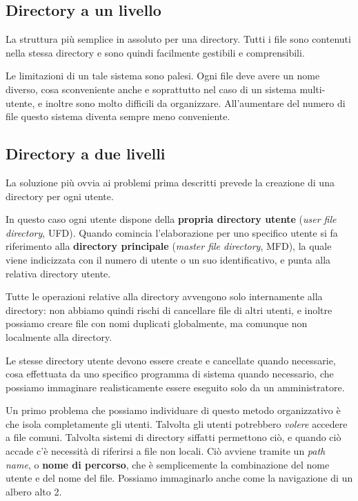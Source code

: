     \subsection{Directory a un livello}
        La struttura più semplice in assoluto per una directory. Tutti i file sono contenuti nella stessa directory e sono quindi facilmente gestibili e comprensibili.
        
        Le limitazioni di un tale sistema sono palesi. Ogni file deve avere un nome diverso, cosa sconveniente anche e soprattutto nel caso di un sistema multi-utente, e inoltre sono molto difficili da organizzare. All'aumentare del numero di file questo sistema diventa sempre meno conveniente.
        
    \subsection{Directory a due livelli}
        La soluzione più ovvia ai problemi prima descritti prevede la creazione di una directory per ogni utente.
        
        In questo caso ogni utente dispone della \textbf{propria directory utente} (\textit{user file directory}, UFD). Quando comincia l'elaborazione per uno specifico utente si fa riferimento alla \textbf{directory principale} (\textit{master file directory}, MFD), la quale viene indicizzata con il numero di utente o un suo identificativo, e punta alla relativa directory utente.
        
        Tutte le operazioni relative alla directory avvengono solo internamente alla directory: non abbiamo quindi rischi di cancellare file di altri utenti, e inoltre possiamo creare file con nomi duplicati globalmente, ma comunque non localmente alla directory.
        
        Le stesse directory utente devono essere create e cancellate quando necessarie, cosa effettuata da uno specifico programma di sistema quando necessario, che possiamo immaginare realisticamente essere eseguito solo da un amministratore.
        
        Un primo problema che possiamo individuare di questo metodo organizzativo è che isola completamente gli utenti. Talvolta gli utenti potrebbero \textit{volere} accedere a file comuni. Talvolta sistemi di directory siffatti permettono ciò, e quando ciò accade c'è necessità di riferirsi a file non locali. Ciò avviene tramite un \textit{path name}, o \textbf{nome di percorso}, che è semplicemente la combinazione del nome utente e del nome del file. Possiamo immaginarlo anche come la navigazione di un albero alto 2.
        
